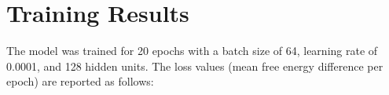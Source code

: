 \documentclass{article}
\begin{document}
\section{Training Results}
The model was trained for 20 epochs with a batch size of 64, learning rate of 0.0001, and 128 hidden units. The loss values (mean free energy difference per epoch) are reported as follows:

\end{document}
